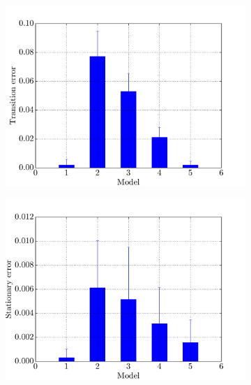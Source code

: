 \begin{figure}[p]
    \centering
    \begin{subfigure}{0.48\textwidth}
    	\centering
        \includegraphics[width=\textwidth]{results/mc1_performance_distances}
        \caption{}
        \label{fig:mc1-performance-transition}
    \end{subfigure}
    \hfill
    \begin{subfigure}{0.48\textwidth}
    	\centering
        \includegraphics[width=\textwidth]{results/mc1_performance_stationary}
        \caption{}
        \label{fig:mc1-performance-stationary}
    \end{subfigure}
    \begin{subfigure}{0.48\textwidth}

\end{subfigure}
\end{figure}
